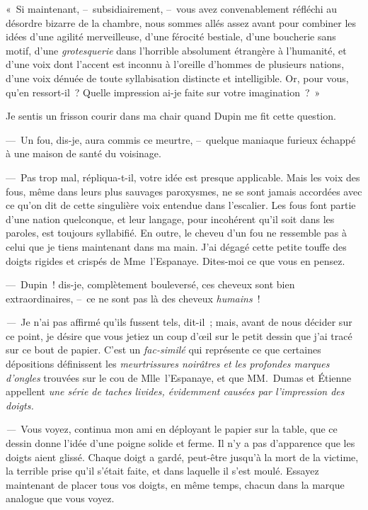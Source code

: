\documentclass[french,twoside]{book} %
\begin{document}
« Si maintenant, – subsidiairement, – vous avez convenablement réfléchi au désordre bizarre de la chambre, nous sommes allés assez avant pour combiner les idées d’une agilité merveilleuse, d’une férocité bestiale, d’une boucherie sans motif, d’une \emph{grotesquerie} dans l’horrible absolument étrangère à l’humanité, et d’une voix dont l’accent est inconnu à l’oreille d’hommes de plusieurs nations, d’une voix dénuée de toute syllabisation distincte et intelligible. Or, pour vous, qu’en ressort-il ? Quelle impression ai-je faite sur votre imagination ? »\par
Je sentis un frisson courir dans ma chair quand Dupin me fit cette question.\par
— Un fou, dis-je, aura commis ce meurtre, – quelque maniaque furieux échappé à une maison de santé du voisinage.\par
— Pas trop mal, répliqua-t-il, votre idée est presque applicable. Mais les voix des fous, même dans leurs plus sauvages paroxysmes, ne se sont jamais accordées avec ce qu’on dit de cette singulière voix entendue dans l’escalier. Les fous font partie d’une nation quelconque, et leur langage, pour incohérent qu’il soit dans les paroles, est toujours syllabifié. En outre, le cheveu d’un fou ne ressemble pas à celui que je tiens maintenant dans ma main. J’ai dégagé cette petite touffe des doigts rigides et crispés de Mme l’Espanaye. Dites-moi ce que vous en pensez.\par
— Dupin ! dis-je, complètement bouleversé, ces cheveux sont bien extraordinaires, – ce ne sont pas là des cheveux \emph{humains} !\par
\emph{—} Je n’ai pas affirmé qu’ils fussent tels, dit-il ; mais, avant de nous décider sur ce point, je désire que vous jetiez un coup d’œil sur le petit dessin que j’ai tracé sur ce bout de papier. C’est un\emph{ fac-similé} qui représente ce que certaines dépositions définissent les\emph{ meurtrissures noirâtres et les profondes marques d’ongles} trouvées sur le cou de Mlle l’Espanaye, et que MM. Dumas et Étienne appellent \emph{une série de taches livides, évidemment causées par l’impression des doigts.}\par
\emph{—} Vous voyez, continua mon ami en déployant le papier sur la table, que ce dessin donne l’idée d’une poigne solide et ferme. Il n’y a pas d’apparence que les doigts aient glissé. Chaque doigt a gardé, peut-être jusqu’à la mort de la victime, la terrible prise qu’il s’était faite, et dans laquelle il s’est moulé. Essayez maintenant de placer tous vos doigts, en même temps, chacun dans la marque analogue que vous voyez.\par
\end{document}
